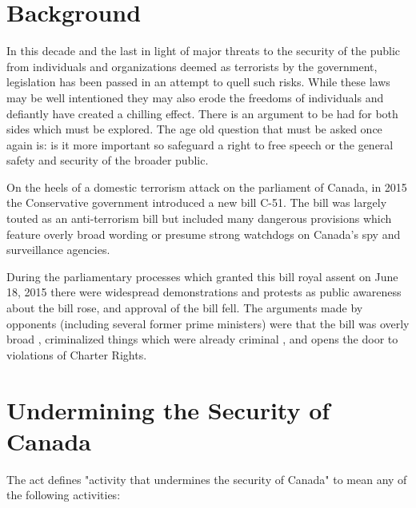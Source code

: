 \documentclass[a4paper, 11pt]{article} %
\begin{document}
\section*{Background}
In this decade and the last in light of major threats to the security of the public from individuals and organizations deemed as terrorists by the government, legislation has been passed in an attempt to quell such risks. While these laws may be well intentioned they may also erode the freedoms of individuals and defiantly have created a chilling effect. There is an argument to be had for both sides which must be explored. The age old question that must be asked once again is: is it more important so safeguard a right to free speech or the general safety and security of the broader public.

On the heels of a domestic terrorism attack on the parliament of Canada, in 2015 the Conservative government introduced a new bill C-51. The bill was largely touted as an anti-terrorism bill but included many dangerous provisions which feature overly broad wording or presume strong watchdogs on Canada's spy and surveillance agencies.

During the parliamentary processes which granted this bill royal assent on June 18, 2015 there were widespread demonstrations and protests as public awareness about the bill rose, and approval of the bill fell. \cite{popularity} The arguments made by opponents (including several former prime ministers) were that the bill was overly broad \cite{businesses}, criminalized things which were already criminal \cite{bar}, and opens the door to violations of Charter Rights. \cite{liberty-for-security}


\section*{Undermining the Security of Canada}
The act defines "activity that undermines the security of Canada" to mean any of the following activities:
\end{document}
